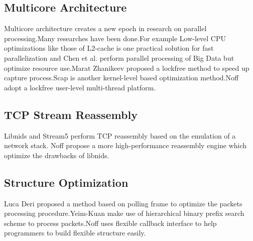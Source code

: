 \documentclass[conference]{IEEEtran}
\begin{document}
\subsection{Multicore Architecture}
Multicore architecture creates a new epoch in research on parallel processing.Many researches have been done.For example Low-level CPU optimizations like those of
L2-cache is one practical solution for fast parallelization\cite{Zhanikeev} and Chen et al. \cite{MapReduce} perform parallel processing of Big Data but optimize resource use.Marat Zhanikeev\cite{Zhanikeev} proposed a lockfree method to speed up capture process.Scap\cite{Papadogiannakis} is another kernel-level based optimization method.Noff adopt a lockfree user-level multi-thread platform.
\subsection{TCP Stream Reassembly}
Libnids\cite{Libnids} and Stream5\cite{Sturges} perform TCP reassembly based on the emulation of a network stack. Noff propose a more high-performance reassembly engine which optimize the drawbacks of libnids.


\subsection{Structure Optimization}
Luca Deri\cite{Deri} proposed a method based on polling frame to optimize the packets processing procedure.Yeim-Kuan\cite{Chang} make use of hierarchical binary prefix search scheme to process packets.Noff uses flexible callback interface to help programmers to build flexible structure easily.
\end{document}
